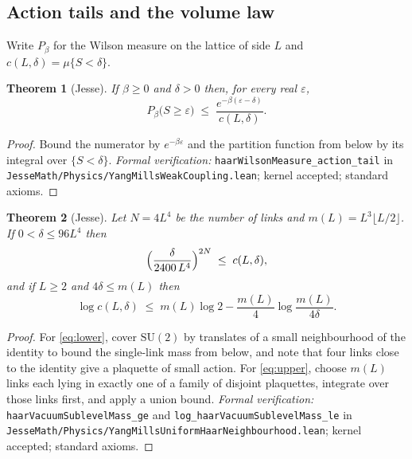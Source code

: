 \documentclass[11pt]{article}
\numberwithin{equation}{subsection}
\theoremstyle{plain}
\newtheorem{theorem}{Theorem}[subsection]
\theoremstyle{definition}
\newcommand{\SU}{\mathrm{SU}}
\begin{document}
\subsection{Action tails and the volume law}

Write $P_\beta$ for the Wilson measure on the lattice of side $L$ and
$c(L,\delta)=\mu\{S<\delta\}$.

\begin{theorem}[Jesse]\label{thm:tail}
If $\beta\ge 0$ and $\delta>0$ then, for every real $\varepsilon$,
\begin{equation}\label{eq:tail}
P_\beta\bigl(S\ge\varepsilon\bigr)\;\le\;\frac{e^{-\beta(\varepsilon-\delta)}}{c(L,\delta)} .
\end{equation}
\end{theorem}
\begin{proof}
Bound the numerator by $e^{-\beta\varepsilon}$ and the partition function from below by its
integral over $\{S<\delta\}$. \emph{Formal verification:} \texttt{haar\allowbreak{}Wilson\allowbreak{}Measure\_\allowbreak{}action\_\allowbreak{}tail}
in \texttt{Jesse\allowbreak{}Math/\allowbreak{}Physics/\allowbreak{}Yang\allowbreak{}Mills\allowbreak{}Weak\allowbreak{}Coupling.\allowbreak{}lean}; kernel accepted; standard axioms.
\end{proof}

\begin{theorem}[Jesse]\label{thm:volume}
Let $N=4L^4$ be the number of links and $m(L)=L^3\lfloor L/2\rfloor$. If $0<\delta\le 96L^4$ then
\begin{equation}\label{eq:lower}
\Bigl(\frac{\delta}{2400\,L^4}\Bigr)^{2N}\;\le\;c(L,\delta),
\end{equation}
and if $L\ge 2$ and $4\delta\le m(L)$ then
\begin{equation}\label{eq:upper}
\log c(L,\delta)\;\le\;m(L)\log 2-\frac{m(L)}{4}\log\frac{m(L)}{4\delta}.
\end{equation}
\end{theorem}
\begin{proof}
For \eqref{eq:lower}, cover $\SU(2)$ by translates of a small neighbourhood of the identity to
bound the single-link mass from below, and note that four links close to the identity give a
plaquette of small action. For \eqref{eq:upper}, choose $m(L)$ links each lying in exactly one
of a family of disjoint plaquettes, integrate over those links first, and apply a union bound.
\emph{Formal verification:} \texttt{haar\allowbreak{}Vacuum\allowbreak{}Sublevel\allowbreak{}Mass\_\allowbreak{}ge} and
\texttt{log\_\allowbreak{}haar\allowbreak{}Vacuum\allowbreak{}Sublevel\allowbreak{}Mass\_\allowbreak{}le} in
\texttt{Jesse\allowbreak{}Math/\allowbreak{}Physics/\allowbreak{}Yang\allowbreak{}Mills\allowbreak{}Uniform\allowbreak{}Haar\allowbreak{}Neighbourhood.\allowbreak{}lean}; kernel accepted; standard axioms.
\end{proof}
\end{document}
